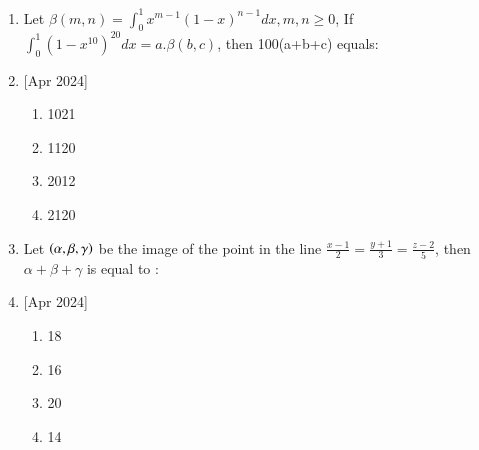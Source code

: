 \documentclass[journal]{IEEEtran}
\begin{document}
\begin{enumerate}
    \item Let $\beta(m,n)=\int_{0}^{1} x^{m-1} (1-x)^{n-1}dx, m,n\geq0$, If $\int_{0}^{1} (1-x^10)^20 dx=a.\beta(b,c)$, then 100(a+b+c) equals:
     \item{[Apr 2024]}
    \begin{multicols}{4}
            \begin{enumerate}
              \item 1021
              \item 1120
              \item 2012
              \item 2120
            \end{enumerate}
        \end{multicols}
    \item Let $\left(\alpha,\beta,\gamma\right)$ be the image of the point  in the line $\frac{x-1}{2}=\frac{y+1}{3}=\frac{z-2}{5}$, then $\alpha+\beta+\gamma$ is equal to : 
     \item{[Apr 2024]}
    \begin{multicols}{4}
            \begin{enumerate}
              \item 18
              \item  16
              \item  20
              \item 14 
              \end{enumerate}
        \end{multicols}


\end{enumerate}
\end{document}
